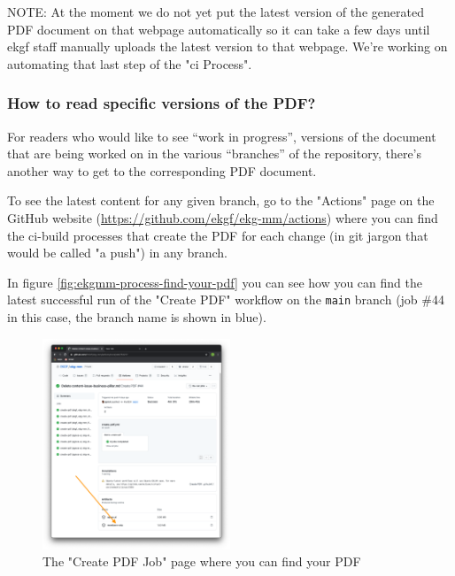 NOTE: At the moment we do not yet put the latest version of the generated 
PDF document on that webpage automatically so it can take a few days until 
\gls{ekgf} staff manually uploads the latest version to that webpage. 
We’re working on automating that last step of the "\gls{ci} Process".

\subsubsection{How to read specific versions of the PDF?}

For readers who would like to see “work in progress”, versions of the document 
that are being worked on in the various “branches” of the repository, 
there’s another way to get to the corresponding PDF document.

To see the latest content for any given branch, go to the "Actions" page 
on the GitHub website (\url{https://github.com/ekgf/ekg-mm/actions}) where you can 
find the \gls{ci}-build processes that create the PDF for each change 
(in git jargon that would be called "a push") in any branch.

In figure \ref{fig:ekgmm-process-find-your-pdf} you can see how you can 
find the latest successful run of the "Create PDF" workflow on the 
\texttt{main} branch (job \#44 in this case, the branch name is shown in blue).

%
%
\begin{figure}
    \vspace{-12pt}
    \begin{center}
        \includegraphics[width=0.50\textwidth]{../images/ekgmm-process-create-pdf-job.png}
    \end{center}
    \caption{The "Create PDF Job" page where you can find your PDF}
    \label{fig:ekgmm-process-create-pdf-job}
\end{figure}

